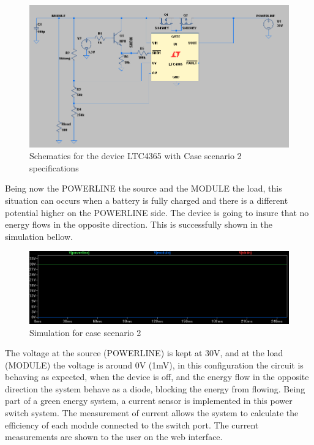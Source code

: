 \begin{figure}[H]
	\begin{centering}
		\includegraphics[width=1\textwidth]{images/tb5_LTC_simu2sc.png}
		\caption{Schematics for the device LTC4365 with Case scenario 2 specifications}
	\end{centering}
\end{figure}
%
Being now the POWERLINE the source and the MODULE the load, this situation can occurs when a battery is fully charged and there is a different potential higher on the POWERLINE side. The device is going to insure that no energy flows in the opposite direction. This is successfully shown in the simulation bellow.
%
\begin{figure}[H]
	\begin{centering}
		\includegraphics[width=1\textwidth]{images/tb5_LTC_simu2.png}
		\caption{Simulation for case scenario 2}
	\end{centering}
\end{figure}
%
The voltage at the source (POWERLINE) is kept at 30V, and at the load (MODULE) the voltage is around 0V (1mV), in this configuration the circuit is behaving as expected, when the device is off, and the energy flow in the opposite direction the system behave as a diode, blocking the energy from flowing.
%
%
Being part of a green energy system, a current sensor is implemented in this power switch system. The measurement of current allows the system to calculate the efficiency of each module connected to the switch port. The current measurements are shown to the user on the web interface.

